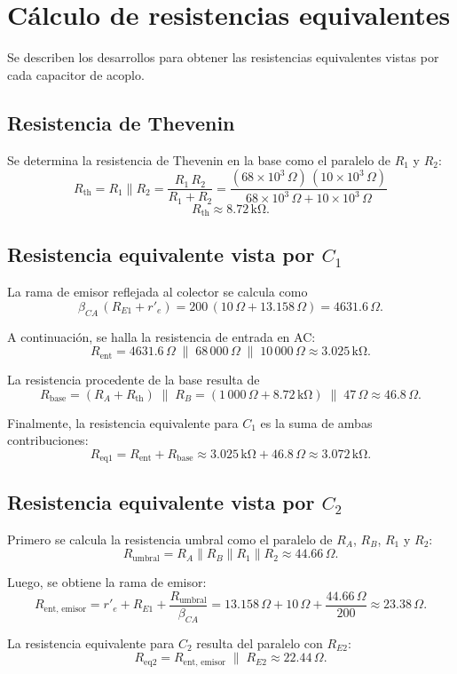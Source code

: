 \documentclass[journal]{IEEEtran}
\begin{document}
\section*{Cálculo de resistencias equivalentes}
\par Se describen los desarrollos para obtener las resistencias equivalentes vistas por cada capacitor de acoplo.

\subsection*{Resistencia de Thevenin}
\par Se determina la resistencia de Thevenin en la base como el paralelo de \(R_1\) y \(R_2\):
\[R_{\mathrm{th}}
= R_1 \parallel R_2
= \frac{R_1\,R_2}{R_1 + R_2}
= \frac{(68\times10^3\,\Omega)\,(10\times10^3\,\Omega)}{68\times10^3\,\Omega + 10\times10^3\,\Omega}\]
\[R_{\mathrm{th}}\approx 8.72\,\mathrm{k\Omega}.\]

\subsection*{Resistencia equivalente vista por \(C_1\)}
\par La rama de emisor reflejada al colector se calcula como
\[
\beta_{CA}\,(R_{E1} + r'_e)
= 200\,(10\,\Omega + 13.158\,\Omega)
= 4631.6\,\Omega.
\]
\par A continuación, se halla la resistencia de entrada en AC:
\[
R_{\mathrm{ent}}
= 4631.6\,\Omega \;\parallel\; 68\,000\,\Omega \;\parallel\; 10\,000\,\Omega
\approx 3.025\,\mathrm{k\Omega}.
\]
\par La resistencia procedente de la base resulta de
\[
R_{\mathrm{base}}
= (R_A + R_{\mathrm{th}})\;\parallel\;R_B
= (1\,000\,\Omega + 8.72\,\mathrm{k\Omega})\;\parallel\;47\,\Omega
\approx 46.8\,\Omega.
\]
\par Finalmente, la resistencia equivalente para \(C_1\) es la suma de ambas contribuciones:
\[
R_{\mathrm{eq1}}
= R_{\mathrm{ent}} + R_{\mathrm{base}}
\approx 3.025\,\mathrm{k\Omega} + 46.8\,\Omega
\approx 3.072\,\mathrm{k\Omega}.
\]

\subsection*{Resistencia equivalente vista por \(C_2\)}
\par Primero se calcula la resistencia umbral como el paralelo de \(R_A\), \(R_B\), \(R_1\) y \(R_2\):
\[
R_{\mathrm{umbral}}
= R_A \parallel R_B \parallel R_1 \parallel R_2
\approx 44.66\,\Omega.
\]
\par Luego, se obtiene la rama de emisor:
\[
R_{\mathrm{ent,\,emisor}}
= r'_e + R_{E1} + \frac{R_{\mathrm{umbral}}}{\beta_{CA}}
= 13.158\,\Omega + 10\,\Omega + \frac{44.66\,\Omega}{200}
\approx 23.38\,\Omega.
\]
\par La resistencia equivalente para \(C_2\) resulta del paralelo con \(R_{E2}\):
\[
R_{\mathrm{eq2}}
= R_{\mathrm{ent,\,emisor}} \;\parallel\; R_{E2}
\approx 22.44\,\Omega.
\]
\end{document}
